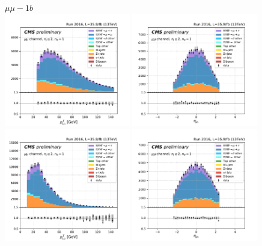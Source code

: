 \begin{figure}[ht]
    \centering
    $\mu\mu - 1b$ \\
    \includegraphics[width=0.49\textwidth]{chapters/Appendix/sectionPlots/figures/kinematics_pickles/mumu/1b/mumu_1b_lepton1_pt.pdf}
    \includegraphics[width=0.49\textwidth]{chapters/Appendix/sectionPlots/figures/kinematics_pickles/mumu/1b/mumu_1b_lepton1_eta.pdf}
    \includegraphics[width=0.49\textwidth]{chapters/Appendix/sectionPlots/figures/kinematics_pickles/mumu/1b/mumu_1b_lepton2_pt.pdf}
    \includegraphics[width=0.49\textwidth]{chapters/Appendix/sectionPlots/figures/kinematics_pickles/mumu/1b/mumu_1b_lepton2_eta.pdf}

\end{figure}
